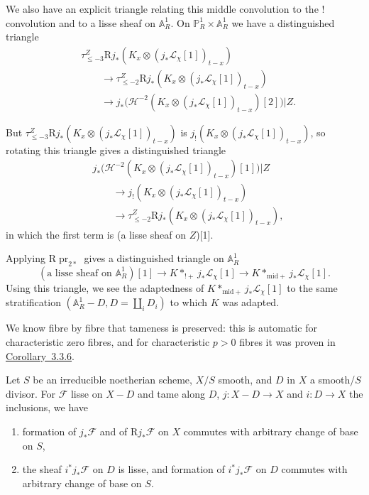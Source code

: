 We also have an explicit triangle relating this middle convolution to the
\(!\) convolution and to a lisse sheaf on \(\mathbb{A}^1_R\). On
\(\mathbb{P}^1_R\times\mathbb{A}^1_R\) we have a distinguished triangle
\[
\begin{aligned}
  &\tau^Z_{\leq -3}
  \mathrm{R}j_*(K_x\otimes(j_*\mathcal{L}_\chi[1])_{t-x}) \\
  &\qquad\to
  \tau^Z_{\leq -2}
  \mathrm{R}j_*(K_x\otimes(j_*\mathcal{L}_\chi[1])_{t-x}) \\
  &\qquad\to
  j_*\bigl(\mathcal{H}^{-2}(K_x\otimes(j_*\mathcal{L}_\chi[1])_{t-x})[2]\bigr)
  \vert Z.
\end{aligned}
\]

But
\(\tau^Z_{\leq -3}\mathrm{R}j_*(K_x\otimes(j_*\mathcal{L}_\chi[1])_{t-x})\) is
\(j_!(K_x\otimes(j_*\mathcal{L}_\chi[1])_{t-x})\), so rotating this triangle
gives a distinguished triangle
\[
\begin{aligned}
  &j_*\bigl(\mathcal{H}^{-2}(K_x\otimes(j_*\mathcal{L}_\chi[1])_{t-x})[1]\bigr)
  \vert Z \\
  &\qquad\to
  j_!(K_x\otimes(j_*\mathcal{L}_\chi[1])_{t-x}) \\
  &\qquad\to
  \tau^Z_{\leq -2}\mathrm{R}j_*(K_x\otimes(j_*\mathcal{L}_\chi[1])_{t-x}),
\end{aligned}
\]
in which the first term is (a lisse sheaf on \(Z\))[1].

Applying \(\mathrm{R}\operatorname{pr}_{2*}\) gives a distinguished triangle on
\(\mathbb{A}^1_R\)
\[
  (\text{a lisse sheaf on }\mathbb{A}^1_R)[1]
  \to
  K*_{!+}j_*\mathcal{L}_\chi[1]
  \to
  K*_{\mathrm{mid}+}j_*\mathcal{L}_\chi[1].
\]
Using this triangle, we see the adaptedness of
\(K*_{\mathrm{mid}+}j_*\mathcal{L}_\chi[1]\) to the same stratification
\((\mathbb{A}^1_R-D,D=\coprod_iD_i)\) to which \(K\) was adapted.

We know fibre by fibre that tameness is preserved: this is automatic for
characteristic zero fibres, and for characteristic \(p>0\) fibres it was proven
in \hyperref[cor:3.3.6]{Corollary~3.3.6}.

Let \(S\) be an irreducible noetherian scheme, \(X/S\) smooth, and \(D\) in
\(X\) a smooth/\(S\) divisor. For \(\mathcal{F}\) lisse on \(X-D\) and tame
along \(D\), \(j:X-D\to X\) and \(i:D\to X\) the inclusions, we have
\begin{enumerate}[label=(\arabic*)]
\item formation of \(j_*\mathcal{F}\) and of
\(\mathrm{R}j_*\mathcal{F}\) on \(X\) commutes with arbitrary change of base on
\(S\),
\item the sheaf \(i^*j_*\mathcal{F}\) on \(D\) is lisse, and formation of
\(i^*j_*\mathcal{F}\) on \(D\) commutes with arbitrary change of base on \(S\).
\end{enumerate}

